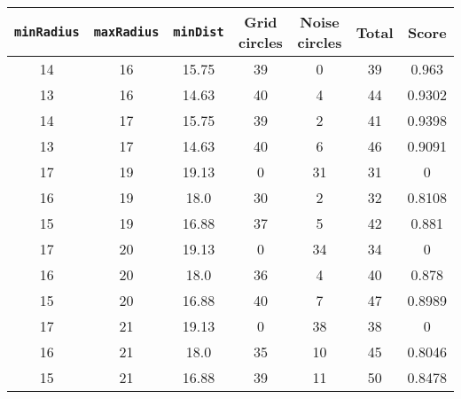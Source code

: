 \documentclass[letterpaper, 12pt]{article}
\begin{document}
\begin{longtable}{|c|c|c|c|c|c|c|}
\hline
\textbf{\texttt{minRadius}} & \textbf{\texttt{maxRadius}} & \textbf{\texttt{minDist}} & \textbf{Grid circles} & \textbf{Noise circles} & \textbf{Total} & \textbf{Score} \\
\hline
14 & 16 & 15.75 & 39 & 0 & 39 & 0.963 \\
\hline
13 & 16 & 14.63 & 40 & 4 & 44 & 0.9302 \\
\hline
14 & 17 & 15.75 & 39 & 2 & 41 & 0.9398 \\
\hline
13 & 17 & 14.63 & 40 & 6 & 46 & 0.9091 \\
\hline
17 & 19 & 19.13 & 0 & 31 & 31 & 0 \\
\hline
16 & 19 & 18.0 & 30 & 2 & 32 & 0.8108 \\
\hline
15 & 19 & 16.88 & 37 & 5 & 42 & 0.881 \\
\hline
17 & 20 & 19.13 & 0 & 34 & 34 & 0 \\
\hline
16 & 20 & 18.0 & 36 & 4 & 40 & 0.878 \\
\hline
15 & 20 & 16.88 & 40 & 7 & 47 & 0.8989 \\
\hline
17 & 21 & 19.13 & 0 & 38 & 38 & 0 \\
\hline
16 & 21 & 18.0 & 35 & 10 & 45 & 0.8046 \\
\hline
15 & 21 & 16.88 & 39 & 11 & 50 & 0.8478 \\
\hline
\end{longtable}
\end{document}
